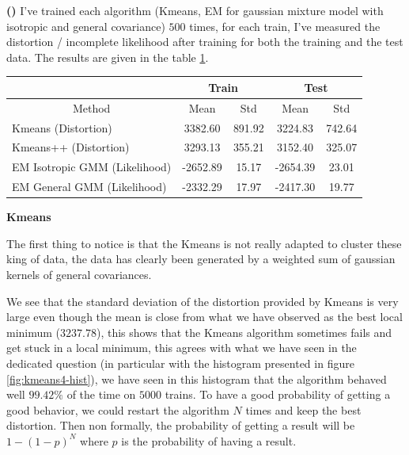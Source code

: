 \documentclass[a4paper, 11pt]{article}
\newcounter{cquestion}[subsection]
\newcounter{csubquestion}[cquestion]
\renewcommand{\thecsubquestion}{\alph{csubquestion}}
\newenvironment{subquestion}
{\par \vspace{0.5em} \noindent \stepcounter{csubquestion} \hspace{-1em}
 \textbf{(\thecsubquestion)}}
{}
\newcommand{\ipart}[1]{\vspace{0.5em}\textbf{#1}\vspace{0.5em}}
\begin{document}
\begin{subquestion}
  I've trained each algorithm (Kmeans, EM for gaussian mixture model
  with isotropic and general covariance) $500$ times, for each train,
  I've measured the distortion / incomplete likelihood after training
  for both the training and the test data. The results are given in the
  table \ref{tab:comparison-distortion-likelihood}.

  \begin{table}[h!]
    \centering
    \begin{tabular}{| l | c | c || c | c |}
      \hline
      & \multicolumn{2}{c||}{\textbf{Train}} & \multicolumn{2}{c|}{\textbf{Test}} \\
      \hline
      \multicolumn{1}{|c|}{Method} & Mean & Std & Mean & Std \\
      \hline
      Kmeans (Distortion)            & 3382.60  & 891.92 & 3224.83  & 742.64  \\
      Kmeans++ (Distortion)          & 3293.13  & 355.21 & 3152.40  & 325.07  \\
      \hline
      EM Isotropic GMM (Likelihood)  & -2652.89 & 15.17  & -2654.39 & 23.01  \\
      EM General GMM (Likelihood)    & -2332.29 & 17.97 & -2417.30 & 19.77 \\
      \hline
    \end{tabular}
     \label{tab:comparison-distortion-likelihood}
  \end{table}

  \newpage
  \ipart{Kmeans}

  The first thing to notice is that the Kmeans is not really adapted
  to cluster these king of data, the data has clearly been generated
  by a weighted sum of gaussian kernels of general covariances.

  We see that the standard deviation of the distortion provided by
  Kmeans is very large even though the mean is close from what we have
  observed as the best local minimum ($3237.78$), this shows that the
  Kmeans algorithm sometimes fails and get stuck in a  local
  minimum, this agrees with what we have seen in the dedicated
  question (in particular with the histogram presented in figure
  \ref{fig:kmeans4-hist}), we have seen in this histogram that the
  algorithm behaved well $99.42\%$ of the time on $5000$ trains.  To
  have a good probability of getting a good behavior, we could restart
  the algorithm $N$ times and keep the best distortion. Then non
  formally, the probability of getting a  result will be
  $1 - (1 - p)^N$ where $p$ is the probability of having a 
  result.


\end{subquestion}
\end{document}
